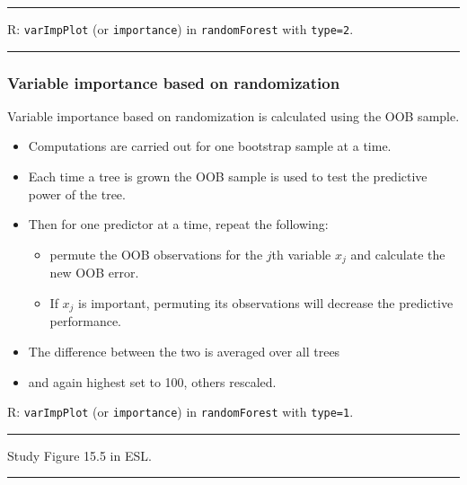 \documentclass[
  letterpaper,
  DIV=11,
  numbers=noendperiod]{scrartcl}
\providecommand{\tightlist}{%
  \setlength{\itemsep}{0pt}\setlength{\parskip}{0pt}}\usepackage{longtable,booktabs,array}
\begin{document}
\begin{center}\rule{0.5\linewidth}{0.5pt}\end{center}

R: \texttt{varImpPlot} (or \texttt{importance}) in \texttt{randomForest}
with \texttt{type=2}.

\begin{center}\rule{0.5\linewidth}{0.5pt}\end{center}

\hypertarget{variable-importance-based-on-randomization}{%
\subsubsection{Variable importance based on
randomization}\label{variable-importance-based-on-randomization}}

Variable importance based on randomization is calculated using the OOB
sample.

\begin{itemize}
\tightlist
\item
  Computations are carried out for one bootstrap sample at a time.
\item
  Each time a tree is grown the OOB sample is used to test the
  predictive power of the tree.
\item
  Then for one predictor at a time, repeat the following:

  \begin{itemize}
  \tightlist
  \item
    permute the OOB observations for the \(j\)th variable \(x_j\) and
    calculate the new OOB error.
  \item
    If \(x_j\) is important, permuting its observations will decrease
    the predictive performance.
  \end{itemize}
\item
  The difference between the two is averaged over all trees
\item
  and again highest set to 100, others rescaled.
\end{itemize}

R: \texttt{varImpPlot} (or \texttt{importance}) in \texttt{randomForest}
with \texttt{type=1}.

\begin{center}\rule{0.5\linewidth}{0.5pt}\end{center}

Study Figure 15.5 in ESL.

\begin{center}\rule{0.5\linewidth}{0.5pt}\end{center}
\end{document}
